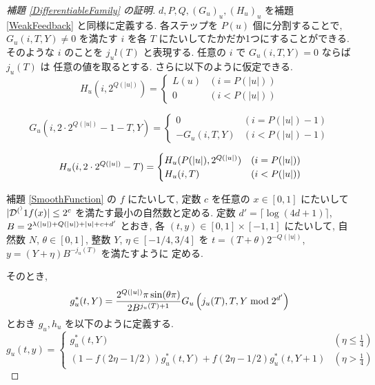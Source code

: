 \begin{proof}[\rm 補題 \ref{DifferentiableFamily} の証明]
 $d, P, Q, (G_u)_u, (H_u)_u$ を補題 \ref{WeakFeedback} と同様に定義する.
 各ステップを $P(u)$ 個に分割することで, $G_u(i, T, Y) \not = 0$ を満たす
 $i$ を各 $T$ にたいしてたかだか1つにすることができる. そのような $i$ のことを 
 $j_ul(T)$ と表現する. 任意の $i$ で $G_u(i, T, Y) = 0$ ならば $j_u(T)$ は
 任意の値を取るとする. 
 さらに以下のように仮定できる.
 \begin{equation}
  H_u(i, 2^{Q(|u|)}) = \begin{cases}
			L(u) & (i=P(|u|)) \\
			0 & (i<P(|u|))
		       \end{cases}
 \end{equation}

 \begin{equation}
  G_u(i, 2\cdot 2^{Q(|u|)} - 1 - T, Y) 
   = \begin{cases}
      0 & (i=P(|u|)-1) \\
      -G_u(i,T,Y) & (i<P(|u|)-1)
     \end{cases}
 \end{equation}

 \begin{equation}
  H_u(i, 2 \cdot 2^{Q(|u|)} - T) 
  = \begin{cases}
    H_u(P(|u|), 2^{Q(|u|)}) & (i={P(|u|)}) \\
    H_u(i, T) &  (i<P(|u|))
    \end{cases}
 \end{equation}

  補題 \ref{SmoothFunction} の $f$ にたいして, 
 定数 $c$ を任意の $x \in [0,1]$ にたいして $|\mathcal D^{(^)}{1}f(x)| \le 2^c$ を満たす最小の自然数と定める.
 定数 $d' = \lceil \log (4d + 1) \rceil$, 
 $B = 2^{{\lambda(|u|)} + {Q(|u|)} + |u| + c + d'}$ とおき, 
 各 $(t, y) \in [0,1] \times [-1, 1]$ にたいして,
 自然数 $N$, $\theta \in [0,1]$, 整数 $Y$, $\eta \in [-1/4, 3/4]$ を
 $t = (T + \theta)2^{-Q(|u|)}$, $y = (Y + \eta)B^{-j_u(T)}$ を満たすように
 定める.
 
 そのとき,
 \begin{equation}
  g^*_u(t, Y) = \frac{2^{Q(|u|)} \pi \sin (\theta\pi)}{2B^{j_u(T)+1}} 
   G_u\left( j_u(T), T, Y \bmod 2^{d'} \right)
 \end{equation}
 とおき $g_u, h_u$ を以下のように定義する.
 \begin{equation}
  g_u(t,y) 
  = \begin{cases}
     g^*_u(t, Y)& (\eta \le \frac 1 4) \\
     ( 1-f ( 2\eta - 1/2)) g^*_u(t, Y) 
     + f ( 2\eta -  1/2) g^*_u(t, Y+1)
     & (\eta > \frac 1 4)
    \end{cases}
  \label{eq:gu}
 \end{equation}


\end{proof}
